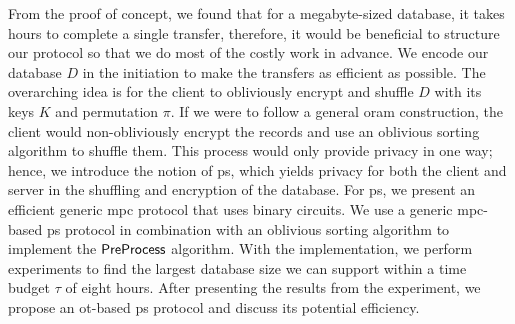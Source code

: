 From the proof of concept, we found that for a megabyte-sized database, it takes hours to complete a single transfer, therefore, it would be beneficial to structure our protocol so that we do most of the costly work in advance. We encode our database $ D $ in the initiation to make the transfers as efficient as possible. The overarching idea is for the client to obliviously encrypt and shuffle $ D $ with its keys $ K $ and permutation $ \pi $. If we were to follow a general \acrshort{oram} construction, the client would non-obliviously encrypt the records and use an oblivious sorting algorithm to shuffle them. This process would only provide privacy in one way; hence, we introduce the notion of \acrfull{ps}, which yields privacy for both the client and server in the shuffling and encryption of the database. For \acrshort{ps}, we present an efficient generic \acrshort{mpc} protocol that uses binary circuits. We use a generic \acrshort{mpc}-based \acrshort{ps} protocol in combination with an oblivious sorting algorithm to implement the $ \mathsf{{PreProcess}} $ algorithm. With the implementation, we perform experiments to find the largest database size we can support within a time budget $ \tau $ of eight hours. After presenting the results from the experiment, we propose an \acrshort{ot}-based \acrshort{ps} protocol and discuss its potential efficiency.